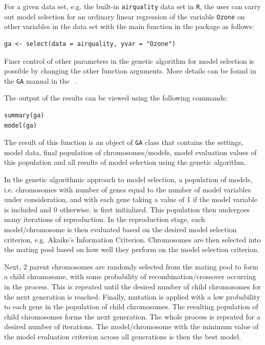 \documentclass[11pt]{article}
\begin{document}
For a given data set, e.g. the built-in \texttt{airquality} data set in \texttt{R}, the user can carry out model selection for an ordinary linear regression of the variable \texttt{Ozone} on other variables in the data set with the main function in the package as follows:
\begin{verbatim}
ga <- select(data = airquality, yvar = "Ozone")
\end{verbatim}

Finer control of other parameters in the genetic algorithm for model selection is possible by changing the other function arguments. More details can be found in the \texttt{GA} manual in the ~.

The output of the results can be viewed using the following commands:
\begin{verbatim}
summary(ga)
model(ga)
\end{verbatim}

The result of this function is an object of \texttt{GA} class that contains the settings, model data, final population of chromosomes/models, model evaluation values of this population and all results of model selection using the genetic algorithm.

In the genetic algorithmic approach to model selection, a population of models, i.e. chromosomes with number of genes equal to the number of model variables under consideration, and with each gene taking a value of 1 if the model variable is included and 0 otherwise, is first initialized. This population then undergoes many iterations of reproduction. In the reproduction stage, each model/chromosome is then evaluated based on the desired model selection criterion, e.g. Akaike's Information Criterion. Chromosomes are then selected into the mating pool based on how well they perform on the model selection criterion. 

Next, 2 parent chromosomes are randomly selected from the mating pool to form a child chromosome, with some probability of recombination/crossover occurring in the process. This is repeated until the desired number of child chromosomes for the next generation is reached. Finally, mutation is applied with a low probability to each gene in the population of child chromosomes. The resulting population of child chromosomes forms the next generation. The whole process is repeated for a desired number of iterations. The model/chromosome with the minimum value of the model evaluation criterion across all generations is then the best model.
\end{document}
